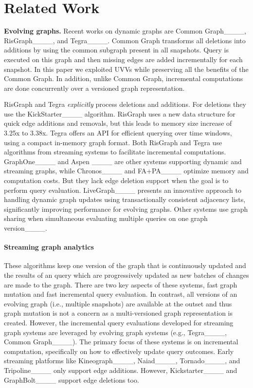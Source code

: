 \section{Related Work}
{\bf Evolving graphs.} Recent works on dynamic graphs are Common Graph____, RisGraph____, and Tegra____. Common Graph transforms all deletions into additions by using the common subgraph present in all snapshots. Query is executed on this graph and then  missing edges are added incrementally for each snapshot. In this paper we exploited UVVs while preserving all the benefits of the Common Graph. In addition, unlike Common Graph, incremental computations are done concurrently over a versioned graph representation.

RisGraph and Tegra \emph{explicitly} process deletions and additions. For deletions they use the KickStarter____ algorithm. RisGraph uses a new data structure for quick edge additions and removals, but this leads to memory size increase of 3.25x to 3.38x. Tegra offers an API for efficient querying over time windows, using a compact in-memory graph format. Both RisGraph and Tegra use algorithms from streaming systems to facilitate incremental computations. GraphOne____ and Aspen ____ are other systems supporting dynamic and streaming graphs, while Chronos____ and FA+PA____ optimize memory and computation costs. But they lack edge deletion support when the goal is to perform query evaluation. LiveGraph____ presents an innovative approach to handling dynamic graph updates using transactionally consistent adjacency lists, significantly improving performance for evolving graphs. Other systems use graph sharing when simultaneous evaluating multiple queries on one graph version____.

\vspace{-0.075in}
\paragraph*{Streaming graph analytics} These algorithms keep one version of the graph that is continuously updated and the results of an query which are progressively updated as new batches of changes are made to the graph. There are two key aspects of these systems, fast graph mutation and fast incremental query evaluation. In contrast, all versions of an evolving graph (i.e., multiple snapshots) are available at the outset and thus graph mutation is not a concern as a multi-versioned graph representation is created. However, the incremental query evaluations developed for streaming graph systems are leveraged by evolving graph systems (e.g., Tegra____, Common Graph____).  The primary focus of these systems is on incremental computation, specifically on how to effectively update query outcomes. Early streaming platforms like Kineograph____, Naiad____, Tornado____, and Tripoline____ only support edge additions. However, Kickstarter____ and GraphBolt____ support edge deletions too.